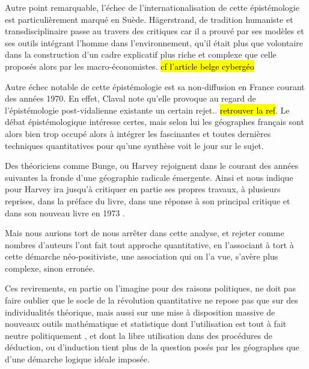 Autre point remarquable, l'échec de l'internationalisation de cette épistémologie est particulièrement marqué en Suède. Hägerstrand, de tradition humaniste et transdisciplinaire \autocite{Bailly2000} passe au travers des critiques car il a prouvé par ses modèles et ses outils intégrant l'homme dans l'environnement, qu'il était plus que volontaire dans la construction d'un cadre explicatif plus riche et complexe que celle proposés alors par les macro-économistes. \hl{cf l'article belge cybergéo}

Autre échec notable de cette épistémologie est sa non-diffusion en France courant des années 1970. En effet, Claval note qu'elle provoque au regard de l'épistémologie post-vidalienne existante un certain rejet.. \hl{retrouver la ref}. Le débat épistémologique intéresse certes, mais selon lui les géographes français sont alors bien trop occupé alors à intégrer les fascinantes et toutes dernières techniques quantitatives pour qu'une synthèse voit le jour sur le sujet.\autocite[27-29]{Claval2003}

Des théoriciens comme Bunge, ou Harvey rejoignent dans le courant des années suivantes la fronde d'une géographie radicale émergente. Ainsi \textcite[30]{Johnston2008} et \textcite[37]{Barnes2005} nous indique pour Harvey ira jusqu'à critiquer en partie ses propres travaux, à plusieurs reprises, dans la préface du livre, dans une réponse à son principal critique \textcite{Gale1972} et dans son nouveau livre en 1973 \autocite{Harvey1972} \autocite[166-168]{Gould2004}. 

Mais nous aurions tort de nous arrêter dans cette analyse, et rejeter comme nombres d'auteurs l'ont fait tout approche quantitative, en l'associant à tort à cette démarche néo-positiviste, une association qui on l'a vue, s'avère plus complexe, sinon erronée.

Ces revirements, en partie on l'imagine pour des raisons politiques, ne doit pas faire oublier que le socle de la révolution quantitative ne repose pas que sur des individualités théorique, mais aussi sur une mise à disposition massive de nouveaux outils mathématique et statistique dont l'utilisation est tout à fait neutre politiquement \autocite{Sheppard2001}, et dont la libre utilisation dans des procédures de déduction, ou d'induction tient plus de la question posés par les géographes que d'une démarche logique idéale imposée. \autocite{Lena2000}

